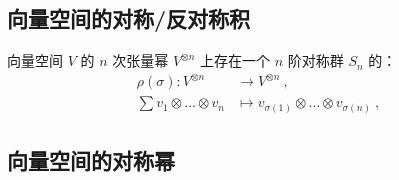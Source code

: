 

\subsection{向量空间的对称/反对称积}

向量空间 $V$ 的 $n$ 次张量幂 $V^{\otimes n}$ 上存在一个 $n$ 阶对称群 $S_n$ 的：
\begin{equation}
\begin{aligned}
\rho(\sigma): V^{\otimes n} &\to V^{\otimes n}~, \\
\sum v_1 \otimes \dots \otimes v_n &\mapsto v_{\sigma(1)} \otimes \dots \otimes v_{\sigma(n)}~,
\end{aligned}
\end{equation}




\subsection{向量空间的对称幂}